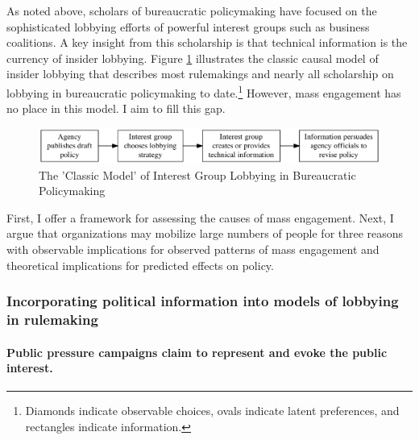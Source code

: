 \documentclass[
      12pt,
        ]{article}
\begin{document}
As noted above, scholars of bureaucratic policymaking have focused on
the sophisticated lobbying efforts of powerful interest groups such as
business coalitions. A key insight from this scholarship is that
technical information is the currency of insider lobbying. Figure
\ref{fig:causal-classic} illustrates the classic causal
model of insider lobbying that describes most rulemakings and nearly all
scholarship on lobbying in bureaucratic policymaking to date.\footnote{Diamonds indicate observable choices, ovals indicate latent preferences, and rectangles indicate information.}
However, mass engagement has no place in this model. I aim to fill this
gap.

\begin{figure}

{\centering \includegraphics[width=6.5in]{../Figs/causal-classic} 

}

\caption{The 'Classic Model' of Interest Group Lobbying in Bureaucratic Policymaking}\label{fig:causal-classic}
\end{figure}

First, I offer a framework for assessing the causes of mass engagement.
Next, I argue that organizations may mobilize large numbers of people
for three reasons with observable implications for observed patterns of
mass engagement and theoretical implications for predicted effects on
policy.

\hypertarget{incorporating-political-information-into-models-of-lobbying-in-rulemaking}{%
\subsubsection{Incorporating political information into models of lobbying in rulemaking}\label{incorporating-political-information-into-models-of-lobbying-in-rulemaking}}

\hypertarget{public-pressure-campaigns-claim-to-represent-and-evoke-the-public-interest.}{%
\paragraph{Public pressure campaigns claim to represent and evoke the public interest.}\label{public-pressure-campaigns-claim-to-represent-and-evoke-the-public-interest.}}
\end{document}
